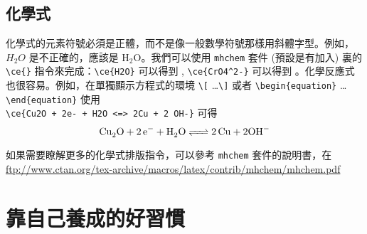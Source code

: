 \section{化學式}
化學式的元素符號必須是正體，而不是像一般數學符號那樣用斜體字型。例如，$H_2O$ 是不正確的，應該是 $\mathrm{H_2O}$。我們可以使用 \verb+mhchem+ 套件 (預設是有加入) 裏的 \verb+\ce{}+ 指令來完成：\verb+\ce{H2O}+ 可以得到 , \verb+\ce{CrO4^2-}+ 可以得到 。化學反應式也很容易。例如，在單獨顯示方程式的環境 \verb+\[+ \dots \verb+\]+ 或者 \verb+\begin{equation}+ \dots \verb+\end{equation}+ 使用 \\
 \verb|\ce{Cu2O + 2e- + H2O <=> 2Cu + 2 OH-}|
 可得
\[
\ce{Cu2O + 2e- + H2O <=> 2Cu + 2 OH-}
\]

如果需要瞭解更多的化學式排版指令，可以參考 \verb+mhchem+ 套件的說明書，在 \url{ftp://www.ctan.org/tex-archive/macros/latex/contrib/mhchem/mhchem.pdf}

\chapter{靠自己養成的好習慣}
\label{sec:habbit}

